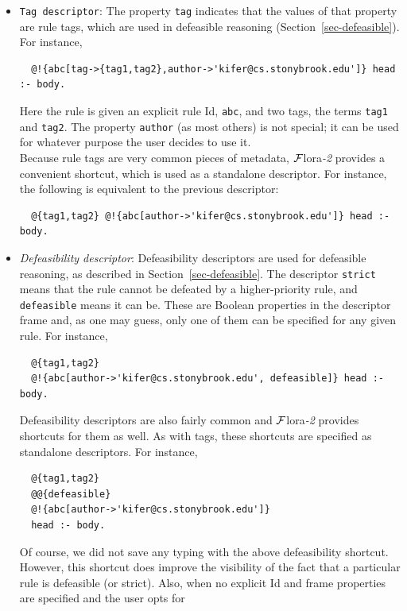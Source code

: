 \documentclass[11pt]{article}
\newcommand{\FLORA}{{\mbox{\sc ${\cal F}${lora}\rm\emph{-2}}}\xspace}
\newcommand{\FLSYSTEM}{\FLORA}
\begin{document}
\begin{itemize}
\item \texttt{Tag descriptor}:
  The property \texttt{tag} indicates that the values of that property are
  rule tags, which are used in defeasible reasoning
  (Section~\ref{sec-defeasible}). For instance,
\begin{verbatim}
  @!{abc[tag->{tag1,tag2},author->'kifer@cs.stonybrook.edu']} head :- body.  
\end{verbatim}
  Here the rule is given an explicit rule Id, \texttt{abc}, and
  two tags, the terms \texttt{tag1} and
  \texttt{tag2}. The
  property \texttt{author} (as most others) is not special; it can be used
  for whatever purpose the user decides to use it.
  \\
  Because rule tags are very common pieces of metadata, \FLSYSTEM provides a
  convenient shortcut, which is used as a standalone descriptor. For
  instance, the following is equivalent to the previous descriptor:
\begin{verbatim}
  @{tag1,tag2} @!{abc[author->'kifer@cs.stonybrook.edu']} head :- body.
\end{verbatim}
\item \emph{Defeasibility descriptor}:
  Defeasibility descriptors are used for defeasible
  reasoning, as described in Section~\ref{sec-defeasible}. The descriptor
  \texttt{strict} means that the rule cannot be defeated by a
  higher-priority rule, and \texttt{defeasible} means it can be. These are
  Boolean properties in the descriptor frame and, as one may guess, only
  one of them can be specified for any given rule. For instance,
\begin{verbatim}
  @{tag1,tag2}
  @!{abc[author->'kifer@cs.stonybrook.edu', defeasible]} head :- body.
\end{verbatim}
  Defeasibility descriptors are also fairly common and \FLSYSTEM provides shortcuts for
  them as well. As with tags, these shortcuts are specified as standalone
  descriptors. For instance,
\begin{verbatim}
  @{tag1,tag2}
  @@{defeasible}
  @!{abc[author->'kifer@cs.stonybrook.edu']}
  head :- body.
\end{verbatim}
  Of course, we did not save any typing with the above defeasibility
  shortcut. However, this shortcut does improve the visibility of
  the fact that a particular rule is defeasible (or strict). Also, when no
  explicit Id and frame properties are specified and the user opts for

\end{itemize}
\end{document}

